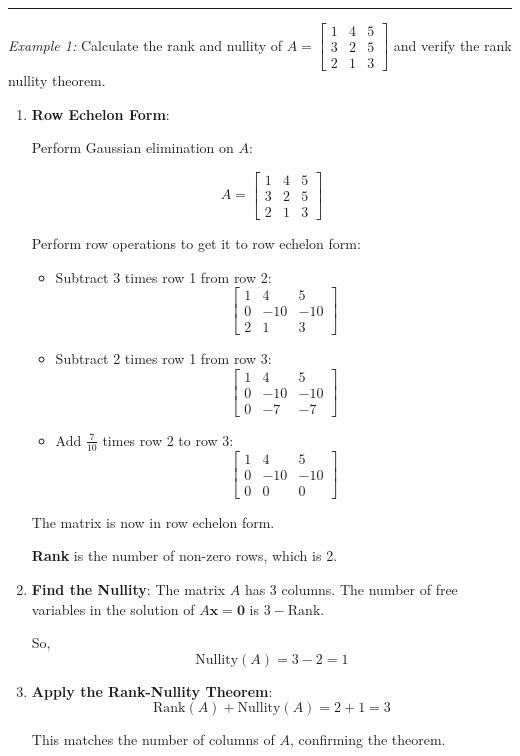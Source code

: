 \documentclass[
  letterpaper,
  DIV=11,
  numbers=noendperiod]{scrreprt}
\theoremstyle{plain}
\theoremstyle{definition}
\theoremstyle{remark}
\begin{document}
\begin{center}\rule{0.5\linewidth}{0.5pt}\end{center}

\emph{Example 1:} Calculate the rank and nullity of
\(A=\begin{bmatrix}   1 & 4 & 5 \\   3 & 2 & 5 \\   2 & 1 & 3   \end{bmatrix}\)
and verify the rank nullity theorem.

\begin{enumerate}
\def\labelenumi{\arabic{enumi}.}
\item
  \textbf{Row Echelon Form}:

  Perform Gaussian elimination on \(A\):

  \[A = \begin{bmatrix} 1 & 4 & 5 \\  3 & 2 & 5 \\   2 & 1 & 3   \end{bmatrix}\]

  Perform row operations to get it to row echelon form:

  \begin{itemize}
  \item
    Subtract 3 times row 1 from row 2:
    \[\begin{bmatrix}     1 & 4 & 5 \\     0 & -10 & -10 \\     2 & 1 & 3     \end{bmatrix}\]
  \item
    Subtract 2 times row 1 from row 3:
    \[\begin{bmatrix}     1 & 4 & 5 \\     0 & -10 & -10 \\     0 & -7 & -7     \end{bmatrix}\]
  \item
    Add \(\frac{7}{10}\) times row 2 to row 3:
    \[\begin{bmatrix}     1 & 4 & 5 \\     0 & -10 & -10 \\     0 & 0 & 0     \end{bmatrix}\]
  \end{itemize}

  The matrix is now in row echelon form.

  \textbf{Rank} is the number of non-zero rows, which is 2.
\item
  \textbf{Find the Nullity}: The matrix \(A\) has 3 columns. The number
  of free variables in the solution of \(A \mathbf{x} = \mathbf{0}\) is
  \(3 - \text{Rank}\).

  So, \[\text{Nullity}(A) = 3 - 2 = 1\]
\item
  \textbf{Apply the Rank-Nullity Theorem}:
  \[\text{Rank}(A) + \text{Nullity}(A) = 2 + 1 = 3\]

  This matches the number of columns of \(A\), confirming the theorem.
\end{enumerate}
\end{document}
